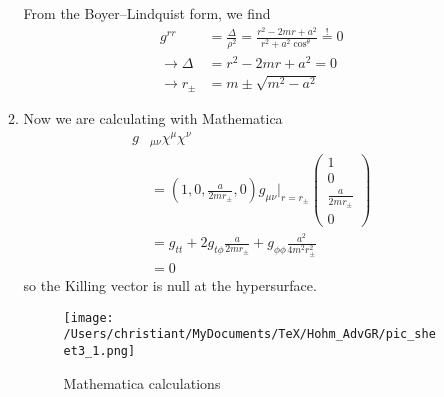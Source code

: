 \documentclass[10pt,a4paper]{article}
\theoremstyle{definition}
\begin{document}
\begin{enumerate}
\begin{enumerate}
From the Boyer–Lindquist form, we find
\begin{align}
g^{rr}&=\frac{\Delta}{\rho^2}=\frac{r^2-2mr+a^2}{r^2+a^2\cos^\theta}\overset{!}{=}0\\
\rightarrow\Delta&=r^2-2mr+a^2=0\\
\rightarrow r_\pm&=m\pm\sqrt{m^2-a^2}
\end{align}

\item Now we are calculating with Mathematica
\begin{align}
g&_{\mu\nu}\chi^\mu\chi^\nu\\
&=\left(1,0,\frac{a}{2mr_\pm},0\right)g_{\mu\nu}|_{r=r_\pm}
\left(\begin{matrix}
1\\
0\\
\frac{a}{2mr_\pm}\\
0
\end{matrix}\right)\\
&=g_{tt}+2g_{t\phi}\frac{a}{2mr_\pm}+g_{\phi\phi}\frac{a^2}{4m^2r^2_\pm}\\
&=0
\end{align}
so the Killing vector is null at the hypersurface.
\begin{figure}[!h]
\centering
\texttt{[image: /Users/christiant/MyDocuments/TeX/Hohm\_AdvGR/pic\_sheet3\_1.png]}
\caption{Mathematica calculations}
\end{figure}
\end{enumerate}


\end{enumerate}
\end{document}
